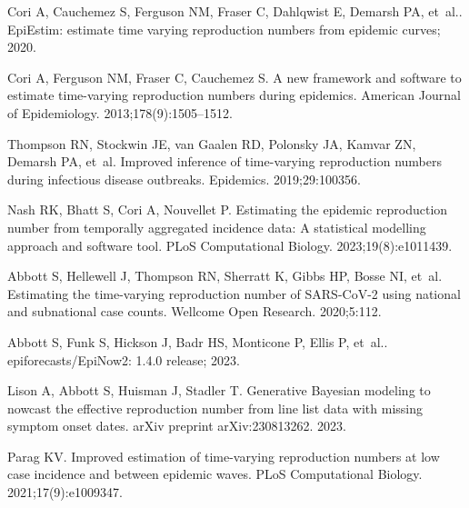 \documentclass[10pt,letterpaper]{article}
\begin{document}
\nolinenumbers

%
%
% 
\begin{thebibliography}{10}

  Cori A, Cauchemez S, Ferguson NM, Fraser C, Dahlqwist E, Demarsh PA, et~al..
    {EpiEstim}: estimate time varying reproduction numbers from epidemic curves;
    2020.
  
  Cori A, Ferguson NM, Fraser C, Cauchemez S.
  \newblock A new framework and software to estimate time-varying reproduction
    numbers during epidemics.
  \newblock American Journal of Epidemiology. 2013;178(9):1505--1512.
  
  Thompson RN, Stockwin JE, van Gaalen RD, Polonsky JA, Kamvar ZN, Demarsh PA,
    et~al.
  \newblock Improved inference of time-varying reproduction numbers during
    infectious disease outbreaks.
  \newblock Epidemics. 2019;29:100356.
  
  Nash RK, Bhatt S, Cori A, Nouvellet P.
  \newblock Estimating the epidemic reproduction number from temporally
    aggregated incidence data: A statistical modelling approach and software
    tool.
  \newblock PLoS Computational Biology. 2023;19(8):e1011439.
  
  Abbott S, Hellewell J, Thompson RN, Sherratt K, Gibbs HP, Bosse NI, et~al.
  \newblock Estimating the time-varying reproduction number of {SARS-CoV-2} using
    national and subnational case counts.
  \newblock Wellcome Open Research. 2020;5:112.
  
  Abbott S, Funk S, Hickson J, Badr HS, Monticone P, Ellis P, et~al..
    epiforecasts/{EpiNow2}: 1.4.0 release; 2023.
  
  Lison A, Abbott S, Huisman J, Stadler T.
  \newblock Generative {B}ayesian modeling to nowcast the effective reproduction
    number from line list data with missing symptom onset dates.
  \newblock arXiv preprint arXiv:230813262. 2023.
  
  Parag KV.
  \newblock Improved estimation of time-varying reproduction numbers at low case
    incidence and between epidemic waves.
  \newblock PLoS Computational Biology. 2021;17(9):e1009347.
  

\end{thebibliography}
\end{document}
